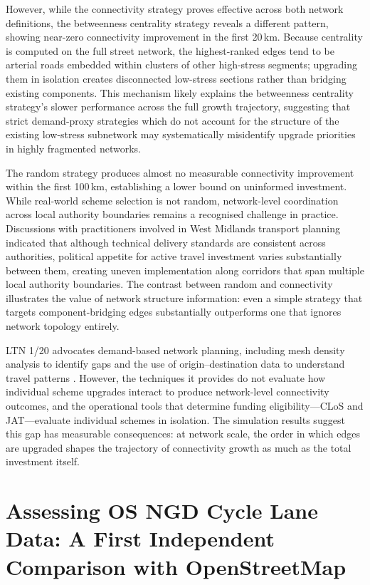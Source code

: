 However, while the connectivity strategy proves effective across both network definitions, the betweenness centrality strategy reveals a different pattern, showing near-zero connectivity improvement in the first 20\,km. Because centrality is computed on the full street network, the highest-ranked edges tend to be arterial roads embedded within clusters of other high-stress segments; upgrading them in isolation creates disconnected low-stress sections rather than bridging existing components. This mechanism likely explains the betweenness centrality strategy's slower performance across the full growth trajectory, suggesting that strict demand-proxy strategies which do not account for the structure of the existing low-stress subnetwork may systematically misidentify upgrade priorities in highly fragmented networks.

The random strategy produces almost no measurable connectivity improvement within the first 100\,km, establishing a lower bound on uninformed investment. While real-world scheme selection is not random, network-level coordination across local authority boundaries remains a recognised challenge in practice. Discussions with practitioners involved in West Midlands transport planning indicated that although technical delivery standards are consistent across authorities, political appetite for active travel investment varies substantially between them, creating uneven implementation along corridors that span multiple local authority boundaries. The contrast between random and connectivity illustrates the value of network structure information: even a simple strategy that targets component-bridging edges substantially outperforms one that ignores network topology entirely.

LTN 1/20 advocates demand-based network planning, including mesh density analysis to identify gaps and the use of origin--destination data to understand travel patterns \parencite{departmentfortransport2020a}. However, the techniques it provides do not evaluate how individual scheme upgrades interact to produce network-level connectivity outcomes, and the operational tools that determine funding eligibility---CLoS and JAT---evaluate individual schemes in isolation. The simulation results suggest this gap has measurable consequences: at network scale, the order in which edges are upgraded shapes the trajectory of connectivity growth as much as the total investment itself.

\section{Assessing OS NGD Cycle Lane Data: A First Independent Comparison with OpenStreetMap}
\label{sec:disc-osvalidation}

